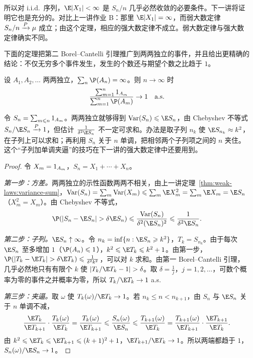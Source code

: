 所以对 i.i.d.\ 序列，$\E\abs{X_1}<\infty$ 是 $S_n/n$ 几乎必然收敛的必要条件。下一讲将证明它也是充分的。对比上一讲作业 B：那里 $\E\abs{X_1}=\infty$，而弱大数定律 $S_n/n\xrightarrow{P}\mu$ 成立；由这个定理，相应的强大数定律不成立。弱大数定律与强大数定律确实不同。

下面的定理把第二 Borel--Cantelli 引理推广到两两独立的事件，并且给出更精确的结论：不仅无穷多个事件发生，发生的个数还与期望个数之比趋于 $1$。

\begin{theorem}\label{thm:borel-cantelli:pairwise}
设 $A_1,A_2,\dots$ 两两独立，$\sum_n\P(A_n)=\infty$。则 $n\to\infty$ 时
\[
\frac{\sum_{m=1}^n\one_{A_m}}{\sum_{m=1}^n\P(A_m)}\to1\quad\text{a.s.}
\]
\end{theorem}

\begin{remark}[证明思路]
令 $S_n=\sum_{m\leqslant n}1_{A_m}$。两两独立就够得到 $\Var(S_n)\leqslant \E S_n$，由 Chebyshev 不等式 $S_n/\E S_n\toP1$，但估计 $\frac1{\delta^2\E S_n}$ 不一定可求和。办法是取子列 $n_k$ 使 $\E S_{n_k}\approx k^2$，在子列上可以求和；再利用 $S_n$ 关于 $n$ 单调，把相邻两个子列项之间的 $n$ 夹住。这个“子列加单调夹逼”的技巧在下一讲的强大数定律中还要用到。
\end{remark}

\begin{proof}
令 $X_m=1_{A_m}$，$S_n=X_1+\cdots+X_n$。

\emph{第一步：方差。}两两独立的示性函数两两不相关，由上一讲定理~\ref{thm:weak-laws:variance-sum}，$\Var(S_n)=\sum_m\Var(X_m)\leqslant\sum_m\E X_m^2=\sum_m\E X_m=\E S_n$（$X_m^2=X_m$）。由 Chebyshev 不等式，
\[
\P(\abs{S_n-\E S_n}>\delta \E S_n)\leqslant\frac{\Var(S_n)}{\delta^2(\E S_n)^2}\leqslant\frac1{\delta^2\E S_n}.
\]

\emph{第二步：子列。}$\E S_n\uparrow\infty$。令 $n_k=\inf\{n:\E S_n\geqslant k^2\}$，$T_k=S_{n_k}$。由于每次 $\E S_n$ 至多增加 $1$（$\P(A_n)\leqslant1$），$k^2\leqslant \E T_k\leqslant k^2+1$。由第一步，$\P(\abs{T_k-\E T_k}>\delta \E T_k)\leqslant\frac1{\delta^2k^2}$，可以对 $k$ 求和。由第一 Borel--Cantelli 引理，几乎必然地只有有限个 $k$ 使 $\abs{T_k/\E T_k-1}>\delta$。取 $\delta=\frac1j$，$j=1,2,\dots$，可数个概率为零的事件之并概率为零，所以 $T_k/\E T_k\to1$ a.s.

\emph{第三步：夹逼。}取 $\omega$ 使 $T_k(\omega)/\E T_k\to1$。若 $n_k\leqslant n<n_{k+1}$，由 $S_n$ 与 $\E S_n$ 关于 $n$ 单调不减，
\[
\frac{\E T_k}{\E T_{k+1}}\cdot\frac{T_k(\omega)}{\E T_k}=\frac{T_k(\omega)}{\E T_{k+1}}\leqslant\frac{S_n(\omega)}{\E S_n}\leqslant\frac{T_{k+1}(\omega)}{\E T_k}=\frac{T_{k+1}(\omega)}{\E T_{k+1}}\cdot\frac{\E T_{k+1}}{\E T_k}.
\]
由 $k^2\leqslant \E T_k\leqslant \E T_{k+1}\leqslant(k+1)^2+1$，$\E T_{k+1}/\E T_k\to1$。所以两端都趋于 $1$，$S_n(\omega)/\E S_n\to1$。
\end{proof}

